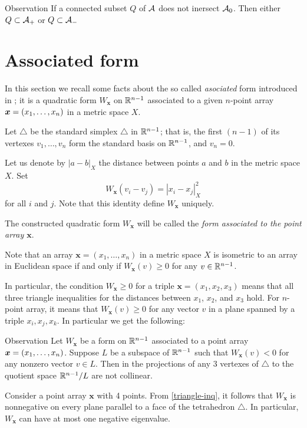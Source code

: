 \documentclass{article}
\begin{document}
\begin{thm}{Observation}\label{obs:connectedA}
If a connected subset $Q$ of $\mathcal{A}$ does not inersect $\mathcal{A}_0$.
Then either $Q\subset \mathcal{A}_+$ or $Q\subset \mathcal{A}_-$
\end{thm}


\section{Associated form}

In this section we recall some facts about the so called \emph{asociated} form introduced in \cite{petrunin-2017};
it is a quadratic form 
$W_{\bm{x}}$ on $\mathbb{R}^{n-1}$ associated
to a given $n$-point array $\bm{x}\z=(x_1,\dots,x_n)$ in a metric space $X$.

Let $\triangle$ be the standard simplex $\triangle$ in $\mathbb{R}^{n-1}$; that is, the first $(n-1)$ of its vertexes $v_1,\dots,v_n$ form the standard basis on $\mathbb{R}^{n-1}$,
 and $v_n=0$.

Let us denote by $|a-b|_X$ the distance between points $a$ and $b$ in the metric space $X$.
Set
\[W_{\bm{x}}(v_i-v_j)=|x_i-x_j|^2_X\] 
for all $i$ and $j$.
Note that this identity define $W_{\bm{x}}$ uniquely.


The constructed quadratic form $W_{\bm{x}}$ will be called the \emph{form associated to the point array $\bm{x}$}.

Note that an array $\bm{x}=(x_1,\dots,x_n)$ in a metric space $X$ is isometric to an array in Euclidean space if and only if 
$W_{\bm{x}}(v)\ge 0$
for any $v\in \mathbb{R}^{n-1}$.

In particular,  the
condition $W_{\bm{x}}\ge 0$ for a triple $\bm{x}=(x_1,x_2,x_3)$ means that 
all three triangle inequalities for the distances between $x_1$, $x_2$, and $x_3$ hold.
For $n$-point array, it means that $W_{\bm{x}}(v)\ge 0$ for any vector $v$ in a plane spanned by a triple $x_i,x_j,x_k$.
In particular we get the following:

\begin{thm}{Observation}\label{triangle-inq}
Let $W_{\bm{x}}$ be a form on $\mathbb{R}^{n-1}$ associated to a point array $\bm{x}\z=(x_1,\dots,x_n)$.
Suppose $L$ be a subspace of $\mathbb{R}^{n-1}$ such that
$W_{\bm{x}}(v)< 0$ for any nonzero vector $v\in L$.
Then in the projections of any 3 vertexes of $\triangle$ to the quotient space $\mathbb{R}^{n-1}/L$ are not collinear.
\end{thm}

Consider a point array $\bm{x}$ with 4 points.
From \ref{triangle-inq}, 
it follows that $W_{\bm{x}}$ 
is nonnegative on every plane parallel to a face of the tetrahedron $\triangle$.
In particular, $W_{\bm{x}}$ can have at most one negative eigenvalue.
\end{document}
